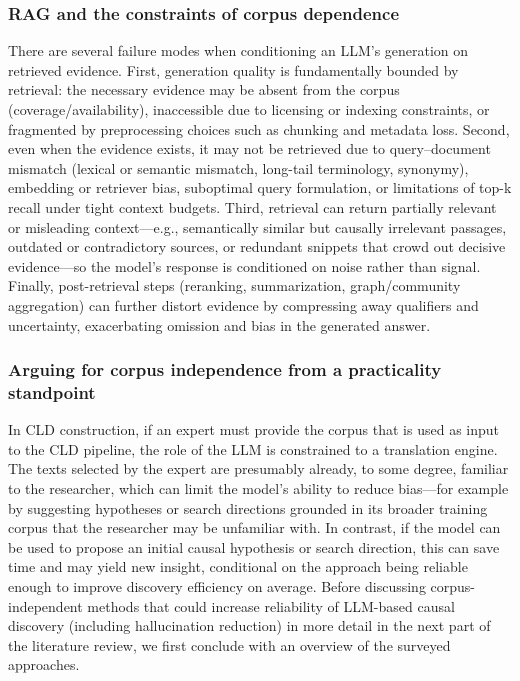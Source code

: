 \subsubsection{RAG and the constraints of corpus dependence}
There are several failure modes when conditioning an LLM's generation on retrieved evidence. First, generation quality is fundamentally bounded by retrieval: the necessary evidence may be absent from the corpus (coverage/availability), inaccessible due to licensing or indexing constraints, or fragmented by preprocessing choices such as chunking and metadata loss. Second, even when the evidence exists, it may not be retrieved due to query--document mismatch (lexical or semantic mismatch, long-tail terminology, synonymy), embedding or retriever bias, suboptimal query formulation, or limitations of top-k recall under tight context budgets. Third, retrieval can return partially relevant or misleading context---e.g., semantically similar but causally irrelevant passages, outdated or contradictory sources, or redundant snippets that crowd out decisive evidence---so the model's response is conditioned on noise rather than signal. Finally, post-retrieval steps (reranking, summarization, graph/community aggregation) can further distort evidence by compressing away qualifiers and uncertainty, exacerbating omission and bias in the generated answer.

\subsubsection{Arguing for corpus independence from a practicality standpoint}
In CLD construction, if an expert must provide the corpus that is used as input to the CLD pipeline, the role of the LLM is constrained to a translation engine. The texts selected by the expert are presumably already, to some degree, familiar to the researcher, which can limit the model's ability to reduce bias---for example by suggesting hypotheses or search directions grounded in its broader training corpus that the researcher may be unfamiliar with. In contrast, if the model can be used to propose an initial causal hypothesis or search direction, this can save time and may yield new insight, conditional on the approach being reliable enough to improve discovery efficiency on average. Before discussing corpus-independent methods that could increase reliability of LLM-based causal discovery (including hallucination reduction) in more detail in the next part of the literature review, we first conclude with an overview of the surveyed approaches.

